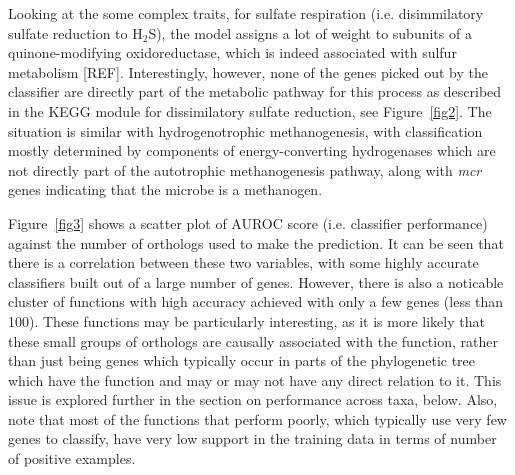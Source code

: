 \documentclass[10pt,letterpaper]{article}
\begin{document}
Looking at the some complex traits, for sulfate respiration (i.e. disimmilatory sulfate reduction to H$_{2}$S), the model assigns a lot of weight to subunits of a quinone-modifying oxidoreductase, which is indeed associated with sulfur metabolism [REF]. Interestingly, however, none of the genes picked out by the classifier are directly part of the metabolic pathway for this process as described in the KEGG module for dissimilatory sulfate reduction, see Figure~\ref{fig2}. The situation is similar with hydrogenotrophic methanogenesis, with classification mostly determined by components of energy-converting hydrogenases which are not directly part of the autotrophic methanogenesis pathway, along with \emph{mcr} genes indicating that the microbe is a methanogen.  

Figure~\ref{fig3} shows a scatter plot of AUROC score (i.e. classifier performance) against the number of orthologs used to make the prediction. It can be seen that there is a correlation between these two variables, with some highly accurate classifiers built out of a large number of genes. However, there is also a noticable cluster of functions with high accuracy achieved with only a few genes (less than 100). These functions may be particularly interesting, as it is more likely that these small groups of orthologs are causally associated with the function, rather than just being genes which typically occur in parts of the phylogenetic tree which have the function and may or may not have any direct relation to it. This issue is explored further in the section on performance across taxa, below. Also, note that most of the functions that perform poorly, which typically use very few genes to classify, have very low support in the training data in terms of number of positive examples.
\end{document}
